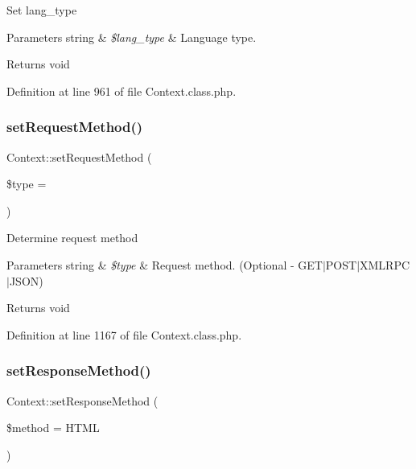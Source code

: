 Set lang\+\_\+type


\begin{DoxyParams}[1]{Parameters}
string & {\em \$lang\+\_\+type} & Language type. \\
\hline
\end{DoxyParams}
\begin{DoxyReturn}{Returns}
void 
\end{DoxyReturn}


Definition at line 961 of file Context.\+class.\+php.

\hypertarget{classContext_afe9abd67c51e0ecc07cf29bf23102926}{}\label{classContext_afe9abd67c51e0ecc07cf29bf23102926} 
\subsubsection{\texorpdfstring{set\+Request\+Method()}{setRequestMethod()}}
{\footnotesize\ttfamily Context\+::set\+Request\+Method (\begin{DoxyParamCaption}\item[{}]{\$type = {\ttfamily \textquotesingle{}\textquotesingle{}} }\end{DoxyParamCaption})}

Determine request method


\begin{DoxyParams}[1]{Parameters}
string & {\em \$type} & Request method. (Optional -\/ G\+E\+T$\vert$\+P\+O\+S\+T$\vert$\+X\+M\+L\+R\+P\+C$\vert$\+J\+S\+ON) \\
\hline
\end{DoxyParams}
\begin{DoxyReturn}{Returns}
void 
\end{DoxyReturn}


Definition at line 1167 of file Context.\+class.\+php.

\hypertarget{classContext_acedc76f48ba8b7342b1bca29fcb8f202}{}\label{classContext_acedc76f48ba8b7342b1bca29fcb8f202} 
\subsubsection{\texorpdfstring{set\+Response\+Method()}{setResponseMethod()}}
{\footnotesize\ttfamily Context\+::set\+Response\+Method (\begin{DoxyParamCaption}\item[{}]{\$method = {\ttfamily \textquotesingle{}HTML\textquotesingle{}} }\end{DoxyParamCaption})}

